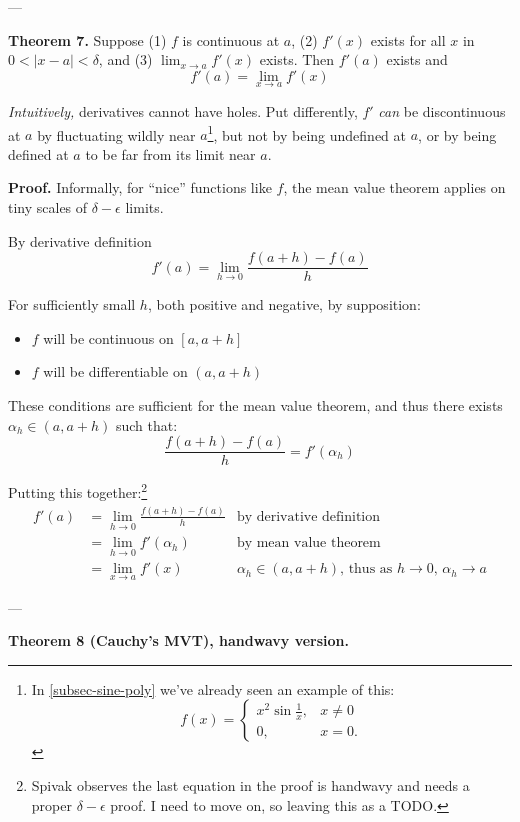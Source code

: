 ---\vs

\textbf{Theorem 7.} Suppose (1) $f$ is continuous at $a$, (2) $f'(x)$
exists for all $x$ in $0<|x-a|<\delta$, and (3) $\lim_{x\to a}f'(x)$ exists.
Then $f'(a)$ exists and
\[f'(a)=\lim_{x\to a}f'(x)\]

\textit{Intuitively,} derivatives cannot have holes. Put differently,
$f'$ \textit{can} be discontinuous at $a$ by fluctuating wildly near
$a$\footnote{In \ref{subsec-sine-poly} we've already seen an example
  of this:
  \[f(x)=\begin{cases}
    x^2\sin \frac{1}{x},&x\neq0\\
    0,&x=0.
  \end{cases}\]}, but
not by being undefined at $a$, or by being defined at $a$ to be far from its limit
near $a$.

\vs

\textbf{Proof.} Informally, for ``nice'' functions like $f$, the mean
value theorem applies on tiny scales of $\delta-\epsilon$ limits.

\vs

By derivative definition
\[f'(a)=\lim_{h\to 0}\frac{f(a+h)-f(a)}{h}\]

For sufficiently small $h$, both positive and negative, by supposition:
\begin{itemize}
\item $f$ will be continuous on $[a,a+h]$
\item $f$ will be differentiable on $(a,a+h)$
\end{itemize}

These conditions are sufficient for the mean value theorem, and thus
there exists $\alpha_h\in(a, a+h)$ such that:
\[\frac{f(a+h)-f(a)}{h}=f'(\alpha_h)\]

Putting this together:\footnote{Spivak observes the last equation in
  the proof is handwavy and needs a proper $\delta-\epsilon$ proof. I need to move
  on, so leaving this as a TODO.}
\begin{align*}
  f'(a)&=\lim_{h\to0}\frac{f(a+h)-f(a)}{h}&\text{by derivative definition}\\
       &=\lim_{h\to0}f'(\alpha_h)&\text{by mean value theorem}\\
       &=\lim_{x\to a}f'(x)&\text{$\alpha_h\in(a,a+h)$, thus as $h\to0$, $\alpha_h\to a$}
\end{align*}

\vs---\vs

\textbf{Theorem 8 (Cauchy's MVT), handwavy version.}

